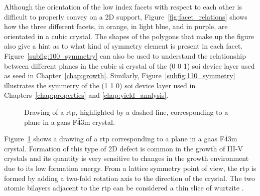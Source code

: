 Although the orientation of the low index facets with respect to each other is difficult to properly convey on a 2D support, Figure~\ref{fig:facet_relations} shows how the three different facets,  in orange,  in light blue, and  in purple, are orientated in a cubic crystal. The shapes of the polygons that make up the figure also give a hint as to what kind of symmetry element is present in each facet. Figure~\ref{subfig:100_symmetry} can also be used to understand the relationship between different planes in the cubic \acl{si} crystal of the \hkl(0 0 1) \acf{soi} device layer used as seed in Chapter~\ref{chap:growth}. Similarly, Figure~\ref{subfig:110_symmetry} illustrates the symmetry of the \hkl(1 1 0) \acs{soi} device layer used in Chapters~\ref{chap:properties} and \ref{chap:yield_analysis}.

\begin{figure}
    \centering
    \caption[Drawing of a  \acl{rtp} in a F\(\bar{4}\)3m crystal.]{Drawing of a \acl{rtp}, highlighted by a dashed line, corresponding to a  plane in a \acs{gaas} F\(\bar{4}\)3m crystal.}
    \label{fig:GaAs_rtp}
\end{figure}

Figure~\ref{fig:GaAs_rtp} shows a drawing of a \acf{rtp} corresponding to a  plane in a \acs{gaas} F\(\bar{4}\)3m crystal. Formation of this type of 2D defect is common in the growth of III-V crystals \cite{Borg2017} and its quantity is very sensitive to changes in the growth environment \cite{Algra2008, Chi2013} due to its low formation energy. From a lattice symmetry point of view, the \acs{rtp} is formed by adding a two-fold rotation axis to the  direction of the crystal. The two atomic bilayers adjacent to the \acs{rtp} can be considered a thin slice of wurtzite \cite{Glas2007, Vedel2022}.

